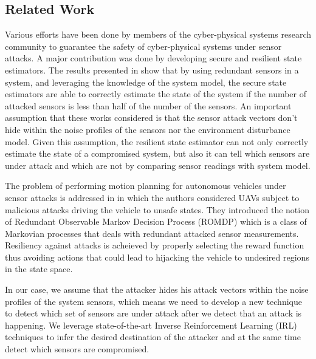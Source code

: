 \documentclass[letterpaper, 10 pt, conference]{ieeeconf}  %
\newcommand\NB[1]{$\spadesuit$\footnote{NB: #1}}
\begin{document}
\subsection{Related Work}\label{subsec:related}

Various efforts have been done by members of the cyber-physical systems research community to guarantee the safety of cyber-physical systems under sensor attacks. A major contribution was done by developing secure and resilient state estimators. The results presented in \cite{Fawzi2014,Ivanov2014,Pajic2014,Pajic2017} show that by using redundant sensors in a system, and leveraging the knowledge of the system model, the secure state estimators are able to correctly estimate the state of the system if the number of attacked sensors is less than half of the number of the sensors. An important assumption that these works considered is that the sensor attack vectors don't hide within the noise profiles of the sensors nor the environment disturbance model. Given this assumption, the resilient state estimator can not only correctly estimate the state of a compromised system, but also it can tell which sensors are under attack and which are not by comparing sensor readings with system model.

The problem of performing motion planning for autonomous vehicles under sensor attacks is addressed in \cite{bezzo2016stochastic} in which the authors considered UAVs subject to malicious attacks driving the vehicle to unsafe states. They introduced the notion of Redundant Observable Markov Decision Process (ROMDP) which is a class of Markovian processes that deals with redundant attacked sensor measurements. Resiliency against attacks is acheieved by properly selecting the reward function thus avoiding actions that could lead to hijacking the vehicle to undesired regions in the state space.

In our case, we assume that the attacker hides his attack vectors within the noise profiles of the system sensors, which means we need to develop a new technique to detect which set of sensors are under attack after we detect that an attack is happening. We leverage state-of-the-art Inverse Reinforcement Learning (IRL) techniques to infer the desired destination of the attacker and at the same time detect which sensors are compromised.
\end{document}
